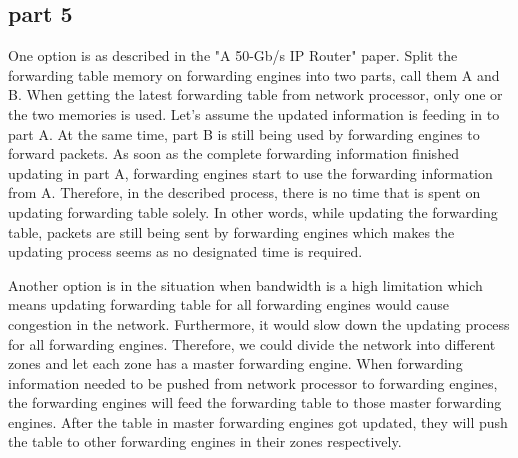 \subsection{part 5}

One option is as described in the "A 50-Gb/s IP Router" paper. Split the forwarding table memory on forwarding engines into two parts, call them A and B. When getting the latest forwarding table from network processor, only one or the two memories is used. Let's assume the updated information is feeding in to part A. At the same time, part B is still being used by forwarding engines to forward packets. As soon as the complete forwarding information finished updating in part A, forwarding engines start to use the forwarding information from A. Therefore, in the described process, there is no time that is spent on updating forwarding table solely. In other words, while updating the forwarding table, packets are still being sent by forwarding engines which makes the updating process seems as no designated time is required.

Another option is in the situation when bandwidth is a high limitation which means updating forwarding table for all forwarding engines would cause congestion in the network. Furthermore, it would slow down the updating process for all forwarding engines. Therefore, we could divide the network into different zones and let each zone has a master forwarding engine. When forwarding information needed to be pushed from network processor to forwarding engines, the forwarding engines will feed the forwarding table to those master forwarding engines. After the table in master forwarding engines got updated, they will push the table to other forwarding engines in their zones respectively.








